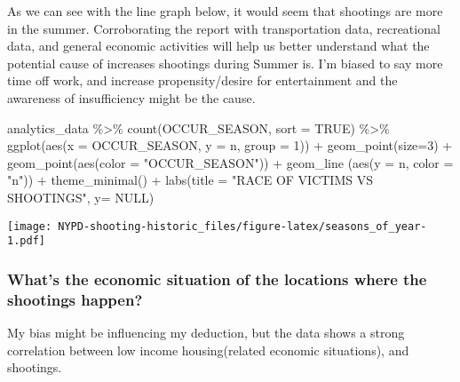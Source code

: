 \documentclass[
]{article}
\newenvironment{Shaded}{\begin{snugshade}}{\end{snugshade}}
\newcommand{\AttributeTok}[1]{\textcolor[rgb]{0.77,0.63,0.00}{#1}}
\newcommand{\ConstantTok}[1]{\textcolor[rgb]{0.00,0.00,0.00}{#1}}
\newcommand{\DecValTok}[1]{\textcolor[rgb]{0.00,0.00,0.81}{#1}}
\newcommand{\FunctionTok}[1]{\textcolor[rgb]{0.00,0.00,0.00}{#1}}
\newcommand{\NormalTok}[1]{#1}
\newcommand{\SpecialCharTok}[1]{\textcolor[rgb]{0.00,0.00,0.00}{#1}}
\newcommand{\StringTok}[1]{\textcolor[rgb]{0.31,0.60,0.02}{#1}}
\begin{document}
As we can see with the line graph below, it would seem that shootings
are more in the summer. Corroborating the report with transportation
data, recreational data, and general economic activities will help us
better understand what the potential cause of increases shootings during
Summer is. I'm biased to say more time off work, and increase
propensity/desire for entertainment and the awareness of insufficiency
might be the cause.

\begin{Shaded}
\begin{Highlighting}[]
\NormalTok{analytics\_data }\SpecialCharTok{\%\textgreater{}\%} \FunctionTok{count}\NormalTok{(OCCUR\_SEASON, }\AttributeTok{sort =} \ConstantTok{TRUE}\NormalTok{) }\SpecialCharTok{\%\textgreater{}\%} \FunctionTok{ggplot}\NormalTok{(}\FunctionTok{aes}\NormalTok{(}\AttributeTok{x =}\NormalTok{ OCCUR\_SEASON, }\AttributeTok{y =}\NormalTok{ n, }\AttributeTok{group =} \DecValTok{1}\NormalTok{)) }\SpecialCharTok{+} \FunctionTok{geom\_point}\NormalTok{(}\AttributeTok{size=}\DecValTok{3}\NormalTok{) }\SpecialCharTok{+} \FunctionTok{geom\_point}\NormalTok{(}\FunctionTok{aes}\NormalTok{(}\AttributeTok{color =} \StringTok{"OCCUR\_SEASON"}\NormalTok{)) }\SpecialCharTok{+} \FunctionTok{geom\_line}\NormalTok{ (}\FunctionTok{aes}\NormalTok{(}\AttributeTok{y =}\NormalTok{ n, }\AttributeTok{color =} \StringTok{"n"}\NormalTok{)) }\SpecialCharTok{+} \FunctionTok{theme\_minimal}\NormalTok{() }\SpecialCharTok{+} \FunctionTok{labs}\NormalTok{(}\AttributeTok{title =} \StringTok{"RACE OF VICTIMS VS SHOOTINGS"}\NormalTok{, }\AttributeTok{y=} \ConstantTok{NULL}\NormalTok{)}
\end{Highlighting}
\end{Shaded}

\texttt{[image: NYPD-shooting-historic\_files/figure-latex/seasons\_of\_year-1.pdf]}

\hypertarget{whats-the-economic-situation-of-the-locations-where-the-shootings-happen}{%
\subsubsection{What's the economic situation of the locations where the
shootings
happen?}\label{whats-the-economic-situation-of-the-locations-where-the-shootings-happen}}

My bias might be influencing my deduction, but the data shows a strong
correlation between low income housing(related economic situations), and
shootings.
\end{document}
